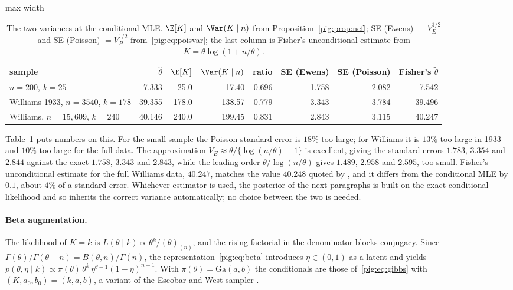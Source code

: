 \begin{table}[t]
\centering
\caption{The two variances at the conditional MLE. $\E[K]$ and $\Var(K\mid n)$ from Proposition~\ref{pig:prop:nef}; SE (Ewens) $=V_E^{1/2}$ and SE (Poisson) $=V_P^{1/2}$ from~\eqref{pig:eq:poisvar}; the last column is Fisher's unconditional estimate from $K=\theta\log(1+n/\theta)$.}
\label{pig:tab:twovar}
\begin{adjustbox}{max width=\textwidth}
\begin{tabular}{@{}lrrrrrrr@{}}
\toprule
sample & $\hat\theta$ & $\E[K]$ & $\Var(K\mid n)$ & ratio & SE (Ewens) & SE (Poisson) & Fisher's $\tilde\theta$\\
\midrule
$n=200$, $k=25$ & 7.333 & 25.0 & 17.40 & 0.696 & 1.758 & 2.082 & 7.542\\
Williams 1933, $n=3540$, $k=178$ & 39.355 & 178.0 & 138.57 & 0.779 & 3.343 & 3.784 & 39.496\\
Williams, $n=15{,}609$, $k=240$ & 40.146 & 240.0 & 199.45 & 0.831 & 2.843 & 3.115 & 40.247\\
\bottomrule
\end{tabular}
\end{adjustbox}
\end{table}

Table~\ref{pig:tab:twovar} puts numbers on this. For the small sample the Poisson standard error is $18\%$ too large; for Williams it is $13\%$ too large in 1933 and $10\%$ too large for the full data. The approximation $V_E\approx\theta/\{\log(n/\theta)-1\}$ is excellent, giving the standard errors $1.783$, $3.354$ and $2.844$ against the exact $1.758$, $3.343$ and $2.843$, while the leading order $\theta/\log(n/\theta)$ gives $1.489$, $2.958$ and $2.595$, too small. Fisher's unconditional estimate for the full Williams data, $40.247$, matches the value $40.248$ quoted by \citet{pig:mccullagh2016}, and it differs from the conditional MLE by $0.1$, about $4\%$ of a standard error. Whichever estimator is used, the posterior of the next paragraphs is built on the exact conditional likelihood and so inherits the correct variance automatically; no choice between the two is needed.

\paragraph{Beta augmentation.} The likelihood of $K=k$ is $L(\theta\mid k)\propto\theta^k/(\theta)_{(n)}$, and the rising factorial in the denominator blocks conjugacy. Since $\Gamma(\theta)/\Gamma(\theta+n)=B(\theta,n)/\Gamma(n)$, the representation~\eqref{pig:eq:beta} introduces $\eta\in(0,1)$ as a latent and yields $p(\theta,\eta\mid k)\propto\pi(\theta)\,\theta^k\,\eta^{\theta-1}(1-\eta)^{n-1}$. With $\pi(\theta)=\mathrm{Ga}(a,b)$ the conditionals are those of~\eqref{pig:eq:gibbs} with $(K,a_0,b_0)=(k,a,b)$, a variant of the Escobar and West sampler \citep{pig:escobar1995}.

